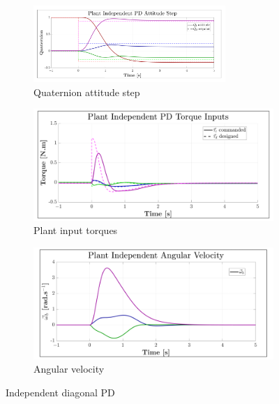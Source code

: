 \begin{figure}[htbp]
\vspace{-10pt}
\centering
\begin{subfigure}{\textwidth}
\centering
\includegraphics[width=0.8\textwidth]{graphs/PD_Diagonal_Independent_Step}
\vspace{-10pt}
\caption{Quaternion attitude step}
\label{fig:PD_Diagonal_Independent_Step}
\end{subfigure}
\begin{subfigure}{0.49\textwidth}
\centering
\includegraphics[width=\textwidth]{graphs/PD_Diagonal_Independent_Torque}
\caption{Plant input torques}
\label{fig:PD_Diagonal_Independent_Torque}
\end{subfigure}
\begin{subfigure}{0.49\textwidth}
\centering
\includegraphics[width=\textwidth]{graphs/PD_Diagonal_Independent_Angular}
\caption{Angular velocity}
\label{fig:PD_Diagonal_Independent_Angular}
\end{subfigure}
\vspace{-8pt}
\caption{Independent diagonal PD}
\vspace{-20pt}
\end{figure}
